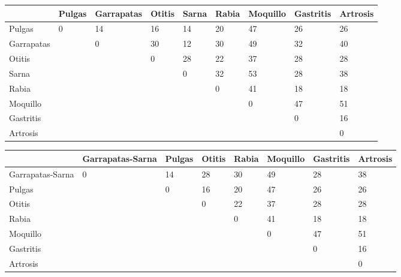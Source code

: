 \documentclass[a4paper,table,xcdraw]{article}
\begin{document}
\begin{longtable}{|l|l|l|l|l|l|l|l|l|}
\hline
           & Pulgas & Garrapatas & Otitis & Sarna & Rabia & Moquillo & Gastritis & Artrosis \\ \hline
\endhead
%
Pulgas     & 0      & 14         & 16     & 14    & 20    & 47       & 26        & 26       \\ \hline
Garrapatas &        & 0          & 30     & 12    & 30    & 49       & 32        & 40       \\ \hline
Otitis     &        &            & 0      & 28    & 22    & 37       & 28        & 28       \\ \hline
Sarna      &        &            &        & 0     & 32    & 53       & 28        & 38       \\ \hline
Rabia      &        &            &        &       & 0     & 41       & 18        & 18       \\ \hline
Moquillo   &        &            &        &       &       & 0        & 47        & 51       \\ \hline
Gastritis  &        &            &        &       &       &          & 0         & 16       \\ \hline
Artrosis   &        &            &        &       &       &          &           & 0        \\ \hline
\end{longtable}

\begin{longtable}{|l|l|l|l|l|l|l|l|}
\hline
                 & Garrapatas-Sarna & Pulgas & Otitis & Rabia & Moquillo & Gastritis & Artrosis \\ \hline
\endhead
%
Garrapatas-Sarna & 0                & 14     & 28     & 30    & 49       & 28        & 38       \\ \hline
Pulgas           &                  & 0      & 16     & 20    & 47       & 26        & 26       \\ \hline
Otitis           &                  &        & 0      & 22    & 37       & 28        & 28       \\ \hline
Rabia            &                  &        &        & 0     & 41       & 18        & 18       \\ \hline
Moquillo         &                  &        &        &       & 0        & 47        & 51       \\ \hline
Gastritis        &                  &        &        &       &          & 0         & 16       \\ \hline
Artrosis         &                  &        &        &       &          &           & 0        \\ \hline
\end{longtable}
\end{document}
